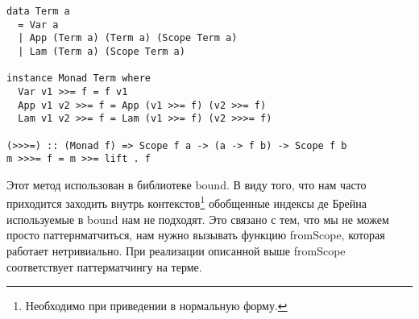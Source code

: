 \begin{lstlisting}[frame=single]
data Term a
  = Var a
  | App (Term a) (Term a) (Scope Term a)
  | Lam (Term a) (Scope Term a)

instance Monad Term where
  Var v1 >>= f = f v1
  App v1 v2 >>= f = App (v1 >>= f) (v2 >>= f)
  Lam v1 v2 >>= f = Lam (v1 >>= f) (v2 >>>= f)

(>>>=) :: (Monad f) => Scope f a -> (a -> f b) -> Scope f b
m >>>= f = m >>= lift . f

\end{lstlisting}

Этот метод использован в библиотеке bound\cite{bound}. В виду того, что нам часто приходится заходить внутрь контекстов\footnote{Необходимо при приведении в нормальную форму.} обобщенные индексы де Брейна используемые в bound нам не подходят. Это связано с тем, что мы не можем просто паттернматчиться, нам нужно вызывать функцию fromScope, которая работает нетривиально. При реализации описанной выше fromScope соответствует паттерматчингу на терме.

